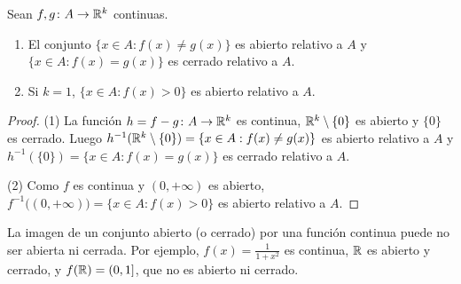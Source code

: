 \begin{corollary}
  Sean \(f, g\colon A \to \mathbb{R}^k\) continuas.
  \begin{enumerate}[label=(\arabic*)]
    \item El conjunto \(\{ x \in A : f(x) \neq g(x) \}\) es abierto relativo a \(A\) y \(\{ x \in A : f(x) = g(x) \}\) es cerrado relativo a \(A\).
    \item Si \(k = 1\), \(\{ x \in A : f(x) > 0 \}\) es abierto relativo a \(A\).
  \end{enumerate}
\end{corollary}

\begin{proof}
  (1) La función \(h = f - g\colon A \to \mathbb{R}^k\) es continua, \(\mathbb{R}^k \setminus \{0\}\) es abierto y \(\{0\}\) es cerrado. Luego \(h^{-1}(\mathbb{R}^k \setminus \{0\}) = \{ x \in A : f(x) \neq g(x) \}\) es abierto relativo a \(A\) y \(h^{-1}(\{0\}) = \{ x \in A : f(x) = g(x) \}\) es cerrado relativo a \(A\).

  (2) Como \(f\) es continua y \((0, +\infty)\) es abierto, \(f^{-1}\bigl( (0, +\infty) \bigr) = \{ x \in A : f(x) > 0 \}\) es abierto relativo a \(A\).
\end{proof}

\begin{note}
  La imagen de un conjunto abierto (o cerrado) por una función continua puede no ser abierta ni cerrada. Por ejemplo, \(f(x) = \frac{1}{1 + x^2}\) es continua, \(\mathbb{R}\) es abierto y cerrado, y \(f(\mathbb{R}) = (0, 1]\), que no es abierto ni cerrado.
\end{note}
